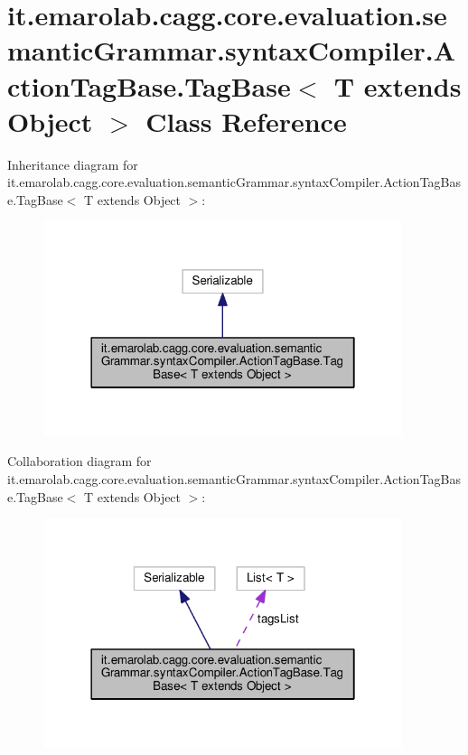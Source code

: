 \hypertarget{classit_1_1emarolab_1_1cagg_1_1core_1_1evaluation_1_1semanticGrammar_1_1syntaxCompiler_1_1Action35425350c71420bf03866231192ab9e7}{\section{it.\-emarolab.\-cagg.\-core.\-evaluation.\-semantic\-Grammar.\-syntax\-Compiler.\-Action\-Tag\-Base.\-Tag\-Base$<$ T extends Object $>$ Class Reference}
\label{classit_1_1emarolab_1_1cagg_1_1core_1_1evaluation_1_1semanticGrammar_1_1syntaxCompiler_1_1Action35425350c71420bf03866231192ab9e7}
}


Inheritance diagram for it.\-emarolab.\-cagg.\-core.\-evaluation.\-semantic\-Grammar.\-syntax\-Compiler.\-Action\-Tag\-Base.\-Tag\-Base$<$ T extends Object $>$\-:\nopagebreak
\begin{figure}[H]
\begin{center}
\leavevmode
\includegraphics[width=298pt]{classit_1_1emarolab_1_1cagg_1_1core_1_1evaluation_1_1semanticGrammar_1_1syntaxCompiler_1_1Action43cdc53eccc93022a690294101e196f8}
\end{center}
\end{figure}


Collaboration diagram for it.\-emarolab.\-cagg.\-core.\-evaluation.\-semantic\-Grammar.\-syntax\-Compiler.\-Action\-Tag\-Base.\-Tag\-Base$<$ T extends Object $>$\-:\nopagebreak
\begin{figure}[H]
\begin{center}
\leavevmode
\includegraphics[width=298pt]{classit_1_1emarolab_1_1cagg_1_1core_1_1evaluation_1_1semanticGrammar_1_1syntaxCompiler_1_1Action1d0d6660a3e579a7997acd11f35df387}
\end{center}
\end{figure}
